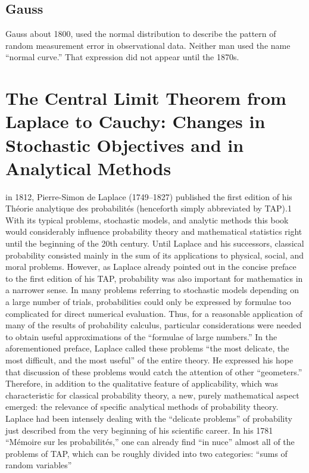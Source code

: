 \documentclass{article}
\begin{document}
\subsection{Gauss}
Gauss about 1800, used the normal distribution to describe the pattern of random
measurement error in observational data. Neither man used the name “normal curve.” That expression did not appear until the 1870s.
\section{The Central Limit Theorem from Laplace
to Cauchy: Changes in Stochastic Objectives
and in Analytical Methods}
in 1812, Pierre-Simon de Laplace (1749–1827) published the first edition of his
Théorie analytique des probabilités (henceforth simply abbreviated by TAP).1 With
its typical problems, stochastic models, and analytic methods this book would considerably influence probability theory and mathematical statistics right until the beginning of the 20th century.
Until Laplace and his successors, classical probability consisted mainly in the
sum of its applications to physical, social, and moral problems. However, as Laplace
already pointed out in the concise preface to the first edition of his TAP, probability
was also important for mathematics in a narrower sense. In many problems referring
to stochastic models depending on a large number of trials, probabilities could only
be expressed by formulae too complicated for direct numerical evaluation. Thus,
for a reasonable application of many of the results of probability calculus, particular considerations were needed to obtain useful approximations of the “formulae
of large numbers.” In the aforementioned preface, Laplace called these problems
“the most delicate, the most difficult, and the most useful” of the entire theory.
He expressed his hope that discussion of these problems would catch the attention of
other “geometers.” Therefore, in addition to the qualitative feature of applicability,
which was characteristic for classical probability theory, a new, purely mathematical
aspect emerged: the relevance of specific analytical methods of probability theory.
Laplace had been intensely dealing with the “delicate problems” of probability
just described from the very beginning of his scientific career. In his 1781 “Mémoire
sur les probabilités,” one can already find “in nuce” almost all of the problems of
TAP, which can be roughly divided into two categories: “sums of random variables”
\end{document}
